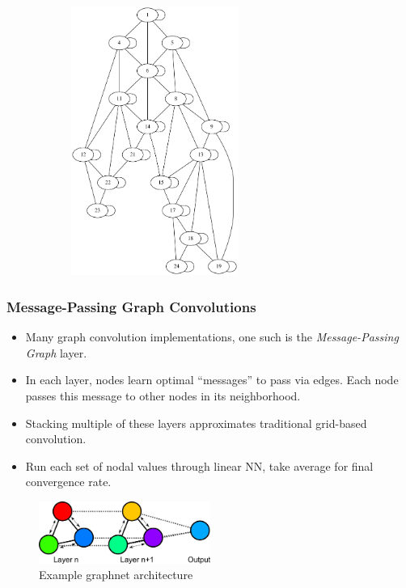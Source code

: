 \documentclass[handout]{beamer}
\renewcommand{\vec}[1]{ {\bf #1} }
\newcommand{\mat}[1]{ \vec{#1} }
\newcommand{\abs}[1]{ \left\lvert #1 \right\rvert }
\begin{document}
\begin{frame}
\begin{figure}[h]
\begin{subfigure}{.40\textwidth}
    \includegraphics[width=0.6\textwidth]{figures/graph.png}
  \end{subfigure}
\end{figure}
\end{frame}


\begin{frame}
  \frametitle{Message-Passing Graph Convolutions}
  \begin{itemize}
  \item Many graph convolution implementations, one such is the \textit{Message-Passing Graph} layer.
  \item In each layer, nodes learn optimal ``messages'' to pass via edges.  Each node passes this message to other nodes in its neighborhood.
  \item Stacking multiple of these layers approximates traditional grid-based convolution.
  \item Run each set of nodal values through linear NN, take average for final convergence rate.
  \end{itemize}
   \begin{figure}[h]
    \includegraphics[width=0.5\textwidth]{figures/graphnet.png}
    \caption{Example graphnet architecture}
\end{figure}
\end{frame}
\end{document}

